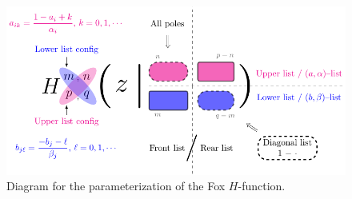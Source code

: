 \documentclass[12pt]{article}
\begin{document}
\begin{figure}[htp]
  \centering
  \includegraphics[width=1.0\textwidth]{./FoxH-Diagram.pdf}
  \caption{Diagram for the parameterization of the Fox $H$-function.}
  \label{F:Diagram}
\end{figure}
 
\end{document}
